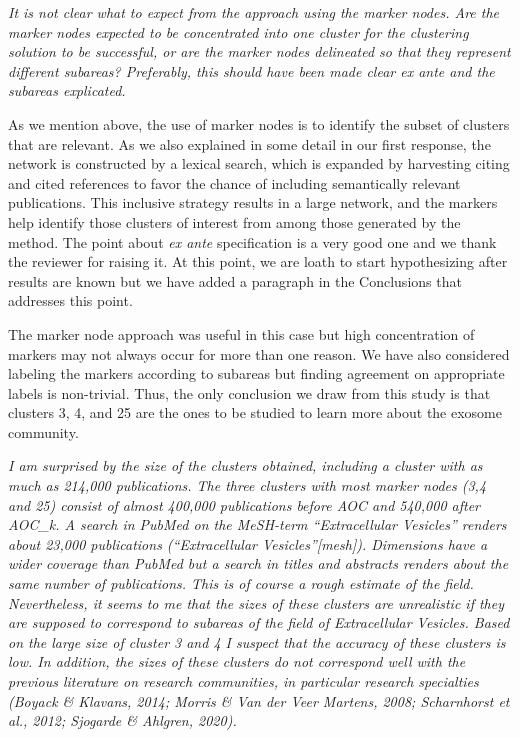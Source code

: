 \documentclass[11pt, oneside]{article}   	%
\begin{document}
\vspace{2 mm}  
\emph{It is not clear what to expect from the approach using the marker nodes. Are the marker nodes expected to be concentrated into one cluster for the clustering solution to be successful, or are the marker nodes delineated so that they represent different subareas? Preferably, this should have been made clear ex ante and the subareas explicated.}

\vspace{2 mm}  
As we mention above, the use of marker nodes is to identify the subset of clusters that are relevant. As we also explained in some detail in our first response, the network is constructed by a lexical search, which is expanded by harvesting citing and cited references to favor the chance of including semantically relevant publications. This inclusive strategy results in a large network, and the markers help identify those clusters of interest from among those generated by the method. The point about \emph{ex ante} specification is a very good one and we thank the reviewer for raising it. At this point, we are loath to start hypothesizing after results are known but we have added a paragraph in the Conclusions that addresses this point.

The marker node approach was useful in this case but high concentration of markers may not always occur for more than one reason. We have also considered labeling the markers according to subareas but finding agreement on appropriate labels is non-trivial. Thus, the only conclusion we draw from this study is that clusters 3, 4, and 25 are the ones to be studied to learn more about the exosome community. 

\vspace{2 mm}  
\emph{ I am surprised by the size of the clusters obtained, including a cluster with as much as 214,000 publications. The three clusters with most marker nodes (3,4 and 25) consist of almost 400,000 publications before AOC and 540,000 after AOC\_k. A search in PubMed on the MeSH-term “Extracellular Vesicles” renders about 23,000 publications (“Extracellular Vesicles”[mesh]). Dimensions have a wider coverage than PubMed but a search in titles and abstracts renders about the same number of publications. This is of course a rough estimate of the field. Nevertheless, it seems to me that the sizes of these clusters are unrealistic if they are supposed to correspond to subareas of the field of Extracellular Vesicles. Based on the large size of cluster 3 and 4 I suspect that the accuracy of these clusters is low. In addition, the sizes of these clusters do not correspond well with the previous literature on research communities, in particular research specialties (Boyack \& Klavans, 2014; Morris \& Van der Veer Martens, 2008; Scharnhorst et al., 2012; Sjogarde \& Ahlgren, 2020).}
\end{document}
